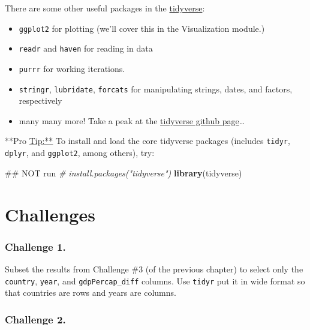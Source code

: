 \documentclass[]{book}
\newenvironment{Shaded}{\begin{snugshade}}{\end{snugshade}}
\newcommand{\KeywordTok}[1]{\textcolor[rgb]{0.13,0.29,0.53}{\textbf{#1}}}
\newcommand{\CommentTok}[1]{\textcolor[rgb]{0.56,0.35,0.01}{\textit{#1}}}
\newcommand{\NormalTok}[1]{#1}
\providecommand{\tightlist}{%
  \setlength{\itemsep}{0pt}\setlength{\parskip}{0pt}}
\begin{document}
There are some other useful packages in the
\href{http://www.tidyverse.org}{tidyverse}:

\begin{itemize}
\tightlist
\item
  \texttt{ggplot2} for plotting (we'll cover this in the Visualization
  module.)
\item
  \texttt{readr} and \texttt{haven} for reading in data
\item
  \texttt{purrr} for working iterations.
\item
  \texttt{stringr}, \texttt{lubridate}, \texttt{forcats} for
  manipulating strings, dates, and factors, respectively
\item
  many many more! Take a peak at the
  \href{https://github.com/tidyverse}{tidyverse github page}\ldots{}
\end{itemize}

**Pro \url{Tip:**} To install and load the core tidyverse packages
(includes \texttt{tidyr}, \texttt{dplyr}, and \texttt{ggplot2}, among
others), try:

\begin{Shaded}
\begin{Highlighting}[]
\NormalTok{## NOT run}
\CommentTok{# install.packages("tidyverse")}
\KeywordTok{library}\NormalTok{(tidyverse)}
\end{Highlighting}
\end{Shaded}

\section{Challenges}\label{challenges-12}

\subsubsection*{Challenge 1.}\label{challenge-1.-7}

Subset the results from Challenge \#3 (of the previous chapter) to
select only the \texttt{country}, \texttt{year}, and
\texttt{gdpPercap\_diff} columns. Use \texttt{tidyr} put it in wide
format so that countries are rows and years are columns.

\subsubsection*{Challenge 2.}\label{challenge-2.-7}
\end{document}

